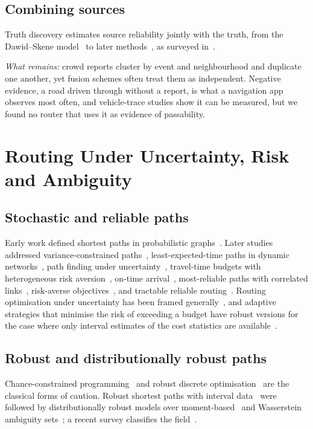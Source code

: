 \documentclass[journal]{IEEEtran}
\begin{document}
\subsection{Combining sources}
Truth discovery estimates source reliability jointly with the truth, from the Dawid--Skene model~\cite{dawid1979em} to later methods~\cite{li2014crh,wang2012truth}, as surveyed in~\cite{li2016truthsurvey}.

\emph{What remains:} crowd reports cluster by event and neighbourhood and duplicate one another, yet fusion schemes often treat them as independent. Negative evidence, a road driven through without a report, is what a navigation app observes most often, and vehicle-trace studies show it can be measured, but we found no router that uses it as evidence of passability.

\section{Routing Under Uncertainty, Risk and Ambiguity}\label{sec:uncertain}
\subsection{Stochastic and reliable paths}
Early work defined shortest paths in probabilistic graphs~\cite{frank1969probabilistic}. Later studies addressed variance-constrained paths~\cite{sivakumar1994variance}, least-expected-time paths in dynamic networks~\cite{fu1998expected,millerhooks2000least}, path finding under uncertainty~\cite{chen2005pathfinding}, travel-time budgets with heterogeneous risk aversion~\cite{lo2006degradable}, on-time arrival~\cite{nie2009ontime}, most-reliable paths with correlated links~\cite{xing2011reliable}, risk-averse objectives~\cite{gavriel2012riskaverse}, and tractable reliable routing~\cite{samaranayake2012reliable}. Routing optimisation under uncertainty has been framed generally~\cite{jaillet2016routing}, and adaptive strategies that minimise the risk of exceeding a budget have robust versions for the case where only interval estimates of the cost statistics are available~\cite{flajolet2018robust}.

\subsection{Robust and distributionally robust paths}
Chance-constrained programming~\cite{charnes1959chance} and robust discrete optimisation~\cite{bertsimas2003robust} are the classical forms of caution. Robust shortest paths with interval data~\cite{yu1998robust,montemanni2004exact} were followed by distributionally robust models over moment-based~\cite{cheng2016drsp,zhang2018rsp,ketkov2021drsp} and Wasserstein ambiguity sets~\cite{wang2020wdrsp}; a recent survey classifies the field~\cite{filippi2025survey}.
\end{document}
